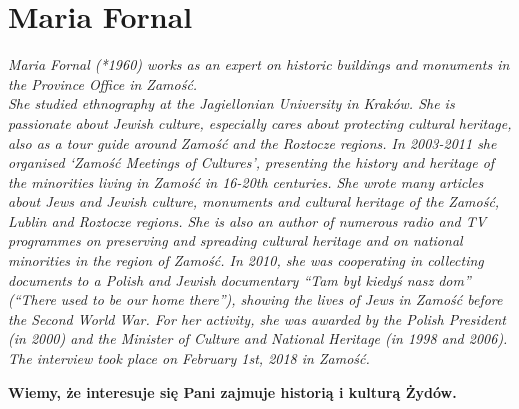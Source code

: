 \section{Maria Fornal}

\textit{Maria Fornal (*1960) works as an expert on historic buildings and monuments in the Province Office in Zamość. \\
She studied ethnography at the Jagiellonian University in Kraków. She is passionate about Jewish culture, especially cares about protecting cultural heritage, also as a tour guide around Zamość and the Roztocze regions. In 2003-2011 she organised ‘Zamość Meetings of Cultures’, presenting the history and heritage of the minorities living in Zamość in 16-20th centuries. She wrote many articles about Jews and Jewish culture, monuments and cultural heritage of the Zamość, Lublin and Roztocze regions. She is also an author of numerous radio and TV programmes on preserving and spreading cultural heritage and on national minorities in the region of Zamość. In 2010, she was cooperating in collecting documents to a Polish and Jewish documentary “Tam był kiedyś nasz dom” (“There used to be our home there”), showing the lives of Jews in Zamość before the Second World War. For her activity, she was awarded by the Polish President (in 2000) and the Minister of Culture and National Heritage (in 1998 and 2006). \\
The interview took place on February 1st, 2018 in Zamość.}\par
\vspace*{2em}
\textbf{Wiemy, że interesuje się Pani zajmuje historią i kulturą Żydów.} \par

